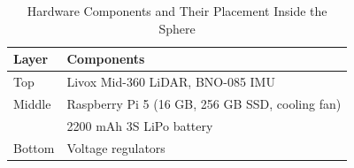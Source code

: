 \documentclass[conference]{IEEEtran}
\begin{document}
\begin{table}
\centering
\caption{Hardware Components and Their Placement Inside the Sphere}
\label{tab:hardware_components_non_actuated}
\begin{tabularx}{\linewidth}{@{}l X@{}}
\toprule
\textbf{Layer} & \textbf{Components} \\
\midrule
Top    & Livox Mid-360 LiDAR, BNO-085 IMU \\
Middle & Raspberry Pi 5 (16 GB, 256 GB SSD, cooling fan) \\
       & 2200 mAh 3S LiPo battery \\
Bottom & Voltage regulators \\
\bottomrule
\end{tabularx}
\vspace{-1em}
\end{table}
\end{document}
